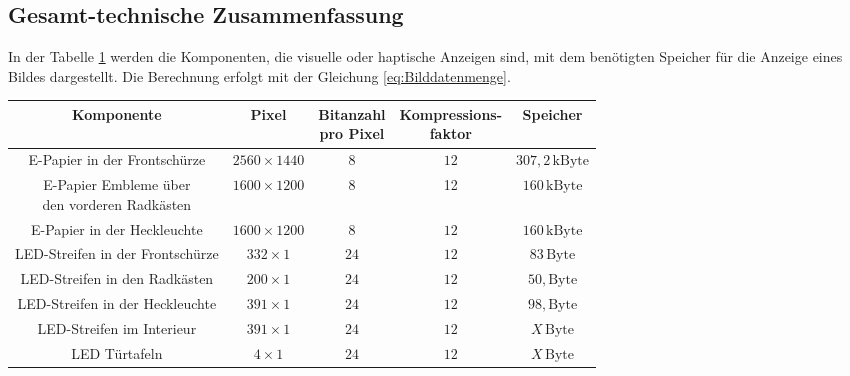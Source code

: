 \subsection{Gesamt-technische Zusammenfassung}
In der Tabelle \ref{tab:Speicherbedarf} werden die Komponenten, die visuelle oder haptische Anzeigen sind, mit dem benötigten Speicher für die Anzeige eines Bildes dargestellt. Die Berechnung erfolgt mit der Gleichung \ref{eq:Bilddatenmenge}.
\begin{table}[hbt]	
	\centering
	\renewcommand{\arraystretch}{1.5}	%
	\label{tab:Speicherbedarf}
	\begin{tabular}{c|cccc}
		\textbf{Komponente} & \parbox[t]{0.16\linewidth}{\centering Pixel} & \parbox[t]{0.16\linewidth}{\centering Bitanzahl \\pro Pixel} & \parbox[t]{0.16\linewidth}{\centering Kompressions-\\faktor} & \parbox[t]{0.16\linewidth}{\centering Speicher} \\ 
		\hline 
		\hline 
		\parbox[t]{0.4\linewidth}{\centering E-Papier in der Frontschürze} & $ 2560 \times 1440 $ & $ 8 $ & $ 12 $ & $ 307,2\,\mathrm{kByte} $\\ \parbox[t]{0.4\linewidth}{\centering E-Papier Embleme über\\den vorderen Radkästen} & $ 1600 \times 1200 $ & $ 8 $ & 12 & $ 160\,\mathrm{kByte} $ \\
		\parbox[t]{0.4\linewidth}{\centering E-Papier in der Heckleuchte} & $ 1600 \times 1200 $ & $ 8 $ & $ 12 $ & $ 160\,\mathrm{kByte} $ \\
		\parbox[t]{0.4\linewidth}{\centering LED-Streifen in der Frontschürze} & $ 332 \times 1 $ & $ 24 $ & $ 12 $ & $ 83\,\mathrm{Byte} $ \\
		\parbox[t]{0.4\linewidth}{\centering LED-Streifen in den Radkästen} & $ 200 \times 1 $ & $ 24 $ & $ 12 $ & $ 50,\mathrm{Byte} $\\ \parbox[t]{0.4\linewidth}{\centering LED-Streifen in der Heckleuchte} & $ 391 \times 1 $ & $ 24 $ & $ 12 $ & $ 98,\mathrm{Byte} $ \\ 
		\parbox[t]{0.4\linewidth}{\centering LED-Streifen im Interieur} & $ 391 \times 1 $ & $ 24 $ & $ 12 $ & $ X\,\mathrm{Byte} $ \\
		\parbox[t]{0.4\linewidth}{\centering LED Türtafeln} & $ 4 \times 1 $ & $ 24 $ & $ 12 $ &  $ X\,\mathrm{Byte} $ \\

\end{tabular}
\end{table}
